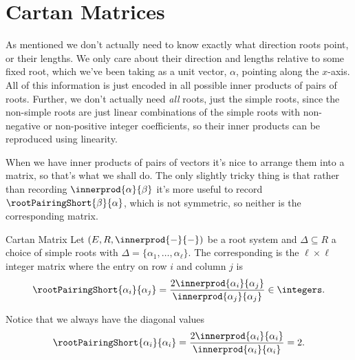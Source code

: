 \documentclass[fleqn]{NotesClass}
\begin{document}
    \section{Cartan Matrices}
    As mentioned we don't actually need to know exactly what direction roots point, or their lengths.
    We only care about their direction and lengths relative to some fixed root, which we've been taking as a unit vector, \(\alpha\), pointing along the \(x\)-axis.
    All of this information is just encoded in all possible inner products of pairs of roots.
    Further, we don't actually need \emph{all} roots, just the simple roots, since the non-simple roots are just linear combinations of the simple roots with non-negative or non-positive integer coefficients, so their inner products can be reproduced using linearity.
    
    When we have inner products of pairs of vectors it's nice to arrange them into a matrix, so that's what we shall do.
    The only slightly tricky thing is that rather than recording \(\innerprod{\alpha}{\beta}\) it's more useful to record \(\rootPairingShort{\beta}{\alpha}\), which is not symmetric, so neither is the corresponding matrix.
    
    \begin{dfn}{Cartan Matrix}{}
        Let \((E, R, \innerprod{-}{-})\) be a root system and \(\Delta \subseteq R\) a choice of simple roots with \(\Delta = \{\alpha_1, \dotsc, \alpha_{\ell}\}\).
        The corresponding  is the \(\ell \times \ell\) integer matrix where the entry on row \(i\) and column \(j\) is
        \begin{equation}
            \rootPairingShort{\alpha_i}{\alpha_j} = \frac{2\innerprod{\alpha_i}{\alpha_j}}{\innerprod{\alpha_j}{\alpha_j}} \in \integers.
        \end{equation}
    \end{dfn}
    
    Notice that we always have the diagonal values
    \begin{equation}
        \rootPairingShort{\alpha_i}{\alpha_i} = \frac{2\innerprod{\alpha_i}{\alpha_i}}{\innerprod{\alpha_i}{\alpha_i}} = 2.
    \end{equation}
    
\end{document}
